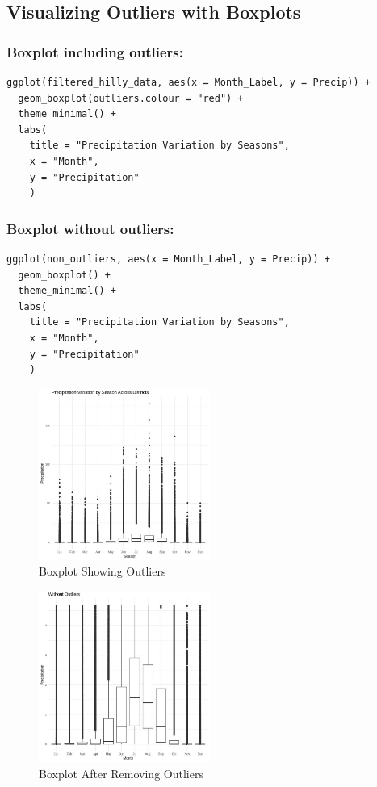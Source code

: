 \subsection*{Visualizing Outliers with Boxplots} 

\subsubsection*{Boxplot including outliers:}

\begin{verbatim}
ggplot(filtered_hilly_data, aes(x = Month_Label, y = Precip)) +
  geom_boxplot(outliers.colour = "red") +
  theme_minimal() +
  labs(
    title = "Precipitation Variation by Seasons", 
    x = "Month", 
    y = "Precipitation"
    )
\end{verbatim}

\subsubsection*{Boxplot without outliers:}

\begin{verbatim}
ggplot(non_outliers, aes(x = Month_Label, y = Precip)) +
  geom_boxplot() +
  theme_minimal() +
  labs(
    title = "Precipitation Variation by Seasons",
    x = "Month",
    y = "Precipitation"
    )
\end{verbatim}

\begin{figure}[h]
\centering
\includegraphics[width=0.5\textwidth]{figures/outliers.jpg}
\caption{Boxplot Showing Outliers}
\end{figure}

\begin{figure}[h]
\centering
\includegraphics[width=0.5\textwidth]{figures/no_outliers.jpg}
\caption{Boxplot After Removing Outliers}
\end{figure}

